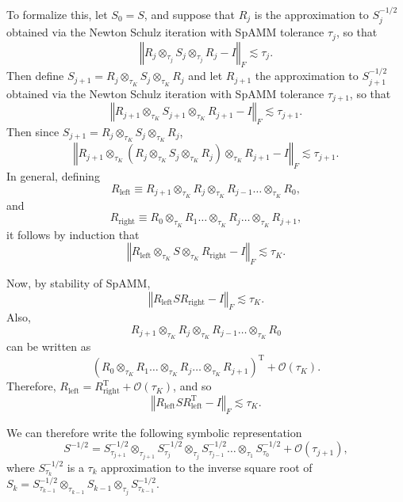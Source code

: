 \documentclass[letterpaper,twocolumn,amsmath,amsfont,amssymb,english,aps,jcp,preprintnumbers,groupaddress,nofootinbib,tightenlines,floatfix]{revtex4}
\theoremstyle{plain}
\theoremstyle{remark}
\theoremstyle{plain}
\begin{document}
To formalize this, let $S_{0}=S$, and suppose that $R_{j}$ is the
approximation to $S_{j}^{-1/2}$ obtained via the Newton Schulz iteration
with SpAMM tolerance $\tau_{j}$, so that
\[
\left\Vert R_{j}\otimes_{\tau_{j}}S_{j}\otimes_{\tau_{j}}R_{j}-I\right\Vert _{F}\lesssim\tau_{j}.
\]
Then define $S_{j+1}=R_{j}\otimes_{\tau_{K}}S_{j}\otimes_{\tau_{K}}R_{j}$
and let $R_{j+1}$ the approximation to $S_{j+1}^{-1/2}$ obtained
via the Newton Schulz iteration with SpAMM tolerance $\tau_{j+1}$,
so that 
\[
\left\Vert R_{j+1}\otimes_{\tau_{K}}S_{j+1}\otimes_{\tau_{K}}R_{j+1}-I\right\Vert _{F}\lesssim\tau_{j+1}.
\]
Then since $S_{j+1}=R_{j}\otimes_{\tau_{K}}S_{j}\otimes_{\tau_{K}}R_{j}$,
\[
\left\Vert R_{j+1}\otimes_{\tau_{K}}\left(R_{j}\otimes_{\tau_{K}}S_{j}\otimes_{\tau_{K}}R_{j}\right)\otimes_{\tau_{K}}R_{j+1}-I\right\Vert _{F}\lesssim\tau_{j+1}.
\]
In general, defining 
\[
R_{\text{left}}\equiv R_{j+1}\otimes_{\tau_{K}}R_{j}\otimes_{\tau_{K}}R_{j-1}\dots\otimes_{\tau_{K}}R_{0},
\]
and 
\[
R_{\text{right}}\equiv R_{0}\otimes_{\tau_{K}}R_{1}\dots\otimes_{\tau_{K}}R_{j}\dots\otimes_{\tau_{K}}R_{j+1},
\]
it follows by induction that 
\[
\left\Vert R_{\text{left}}\otimes_{\tau_{K}}S\otimes_{\tau_{K}}R_{\text{right}}-I\right\Vert _{F}\lesssim\tau_{K}.
\]


Now, by stability of SpAMM,
\[
\left\Vert R_{\text{left}}SR_{\text{right}}-I\right\Vert _{F}\lesssim\tau_{K}.
\]
Also,
\[
R_{j+1}\otimes_{\tau_{K}}R_{j}\otimes_{\tau_{K}}R_{j-1}\dots\otimes_{\tau_{K}}R_{0} 
\]
can be written as
\[ 
 \left(R_{0}\otimes_{\tau_{K}}R_{1}\dots\otimes_{\tau_{K}}R_{j}\dots\otimes_{\tau_{K}}R_{j+1}\right)^{\text{T}}+\mathcal{O}\left(\tau_{K}\right).
\]
Therefore, $R_{\text{left}}=R_{\text{right}}^{\text{T}}+\mathcal{O}\left(\tau_{K}\right)$,
and so 
\begin{equation}
\left\Vert R_{\text{left}}SR_{\text{left}}^{\text{T}}-I\right\Vert _{F}\lesssim\tau_{K}.\label{eq:product decomposition error bound}
\end{equation}


We can therefore write the following symbolic representation 
\[
S^{-1/2}=S_{\tau_{j+1}}^{-1/2}\otimes_{\tau_{j+1}}S_{\tau_{j}}^{-1/2}\otimes_{\tau_{j}}S_{\tau_{j-1}}^{-1/2}\dots\otimes_{\tau_{1}}S_{\tau_{0}}^{-1/2}+\mathcal{O}\left(\tau_{j+1}\right),
\]
where $S_{\tau_{k}}^{-1/2}$ is a $\tau_{k}$ approximation to the
inverse square root of $S_{k}=S_{\tau_{k-1}}^{-1/2}\otimes_{\tau_{k-1}}S_{k-1}\otimes_{\tau_{j}}S_{\tau_{k-1}}^{-1/2}$. 





\end{document}
